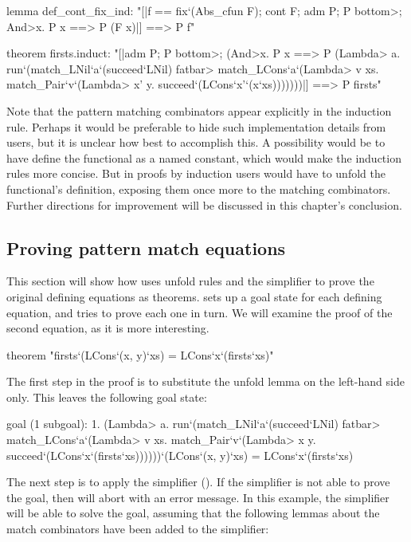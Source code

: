 \begin{isacode}
lemma def_cont_fix_ind:
  "[|f == fix`(Abs_cfun F); cont F; adm P; P \<bottom>; \<And>x. P x ==> P (F x)|] ==> P f"
\end{isacode}
\unmedskip
{}
\begin{isacode}
theorem firsts.induct:
  "[|adm P; P \<bottom>;
    (\<And>x. P x ==> P (\<Lambda> a. run`(match_LNil`a`(succeed`LNil) \<fatbar>
      match_LCons`a`(\<Lambda> v xs. match_Pair`v`(\<Lambda> x' y. succeed`(LCons`x'`(x`xs)))))))|]
    ==> P firsts"
\end{isacode}
%
Note that the pattern matching combinators appear explicitly in the induction rule. Perhaps it would be preferable to hide such implementation details from users, but it is unclear how best to accomplish this. A possibility would be to have {\fixrec} define the functional as a named constant, which would make the induction rules more concise.  But in proofs by induction users would have to unfold the functional's definition, exposing them once more to the matching combinators. Further directions for improvement will be discussed in this chapter's conclusion.

\subsection{Proving pattern match equations}
\label{sec:fixrec-impl-simps}

This section will show how {\fixrec} uses unfold rules and the simplifier to prove the original defining equations as theorems. {\fixrec} sets up a goal state for each defining equation, and tries to prove each one in turn. We will examine the proof of the second equation, as it is more interesting.
%
\begin{isacode}
theorem "firsts`(LCons`(x, y)`xs) = LCons`x`(firsts`xs)"
\end{isacode}
%
The first step in the proof is to substitute the unfold lemma  on the left-hand side only. This leaves the following goal state:
%
\begin{isacode}
goal (1 subgoal):
 1. (\<Lambda> a. run`(match_LNil`a`(succeed`LNil) \<fatbar> match_LCons`a`(\<Lambda> v xs.
    match_Pair`v`(\<Lambda> x y. succeed`(LCons`x`(firsts`xs))))))`(LCons`(x, y)`xs)
  = LCons`x`(firsts`xs)
\end{isacode}
%
The next step is to apply the simplifier (). If the simplifier is not able to prove the goal, then {\fixrec} will abort with an error message. In this example, the simplifier will be able to solve the goal, assuming that the following lemmas about the match combinators have been added to the simplifier:

